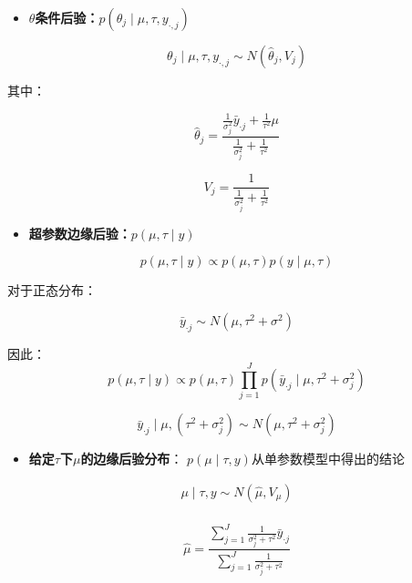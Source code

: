 \begin{itemize}
\item
  \textbf{\(\theta\)条件后验：}\(p(\theta_{j} \mid \mu, \tau, y_{\cdot, j})\)
\end{itemize}

\[\theta_{j} \mid \mu, \tau, y_{\cdot, j} \sim N\left(\hat{\theta}_{j}, V_{j}\right)\]

其中：

\[\hat{\theta}_{j}=
\frac
{\frac{1}{\sigma_{j}^{2}} \bar{y}_{\cdot j}+
\frac{1}{\tau^{2}} \mu}
{\frac{1}{\sigma_{j}^{2}}+\frac{1}{\tau^{2}}}\]

\[V_{j}=\frac{1}{\frac{1}{\sigma_{j}^{2}}+\frac{1}{\tau^{2}}}\]

\begin{itemize}
\item
  \textbf{超参数边缘后验：}\(p(\mu, \tau \mid y)\)
\end{itemize}

\[p(\mu, \tau \mid y) \propto p(\mu, \tau) p(y \mid \mu, \tau)\]

对于正态分布：

\[\bar{y}_{\cdot j}\sim N(\mu,\tau^2+\sigma^2)\]

因此：
\begin{equation}
  p(\mu, \tau \mid y) \propto p(\mu, \tau) 
  \prod_{j=1}^{J} p\left(\bar{y} _{\cdot j} \mid \mu, \tau^{2}+\sigma_{j}^{2}\right)
\end{equation}

\begin{equation}
  \bar{y}_{\cdot j} \mid \mu, (\tau^{2}+\sigma_{j}^{2}) 
  \sim
  N \left( \mu, \tau^{2} + \sigma_{j}^{2} \right)
\end{equation}

\begin{itemize}
\item
  \textbf{给定\(\tau\)下\(\mu\)的边缘后验分布}：
  \(p(\mu \mid \tau, y)\)从单参数模型中得出的结论
\end{itemize}

\begin{equation}
  \begin{array}{c}
    \mu \mid \tau, y \sim N\left(\hat{\mu}, V_{\mu}\right) \\
    \end{array}
\end{equation}


\[\hat{\mu}=\frac{\sum_{j=1}^{J} \frac{1}{\sigma_{j}^{2}+\tau^{2}} \bar{y}_{\cdot j}}{\sum_{j=1}^{J} \frac{1}{\sigma_{j}^{2}+\tau^{2}}}\]

